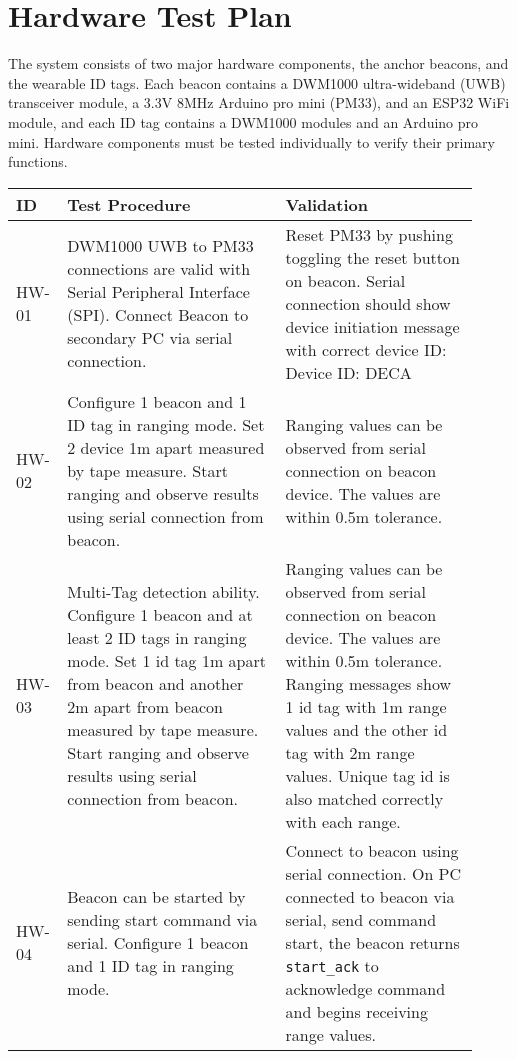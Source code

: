 

\setcounter{section}{2}
\section{Hardware Test Plan}
\bigskip

The system consists of two major hardware components, the anchor beacons, and the wearable ID tags. Each beacon contains a DWM1000 ultra-wideband (UWB) transceiver module, a 3.3V 8MHz Arduino pro mini (PM33), and an ESP32 WiFi module, and each ID tag contains a DWM1000 modules and an Arduino pro mini. Hardware components must be tested individually to verify their primary functions.


\bigskip
\bgroup
\def\arraystretch{1.3}
\begin{table}[h!]
    \centering
    \begin{tabular}{|p{0.07\linewidth}|p{0.45\linewidth}|p{0.40\linewidth}|}  
    \hline
    ID & Test Procedure & Validation\\ 

    \hline
    HW-01
	& DWM1000 UWB to PM33 connections are valid with Serial Peripheral Interface (SPI). Connect Beacon to secondary PC via serial connection.
	& Reset PM33 by pushing toggling the reset button on beacon. Serial connection should show device initiation message with correct device ID: Device ID: DECA\\
     
    \hline  
    HW-02
	& Configure 1 beacon and 1 ID tag in ranging mode. Set 2 device 1m apart measured by tape measure. Start ranging and observe results using serial connection from beacon.
	& Ranging values can be observed from serial connection on beacon device. The values are within 0.5m tolerance.\\

	\hline  
	HW-03
	& Multi-Tag detection ability. Configure 1 beacon and at least 2 ID tags in ranging mode. Set 1 id tag 1m apart from beacon and another 2m apart from beacon measured by tape measure. Start ranging and observe results using serial connection from beacon.
	& Ranging values can be observed from serial connection on beacon device. The values are within 0.5m tolerance. Ranging messages show 1 id tag with 1m range values and the other id tag with 2m range values. Unique tag id is also matched correctly with each range. \\
	
	\hline  
	HW-04
	& Beacon can be started by sending start command via serial. Configure 1 beacon and 1 ID tag in ranging mode.
	& Connect to beacon using serial connection.
	On PC connected to beacon via serial, send command start, the beacon returns \texttt{start\_ack} to acknowledge command and begins receiving range values.\\
	

\end{tabular}
\end{table}
